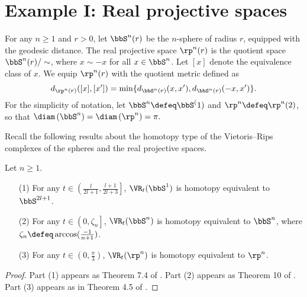 
\section{Example I: Real projective spaces}\label{s:continuous}



For any $n\geq 1$ and $r>0$, let $\bbS^n(r)$ be the $n$-sphere of radius $r$, equipped with the geodesic distance.
The real projective space $\rp^n(r)$ is the quotient space $\bbS^n(r)/\sim$, where $x\sim -x$ for all $x\in \bbS^n $. Let $[x]$ denote the equivalence class of $x$. We equip $\rp^n(r)$ with the quotient metric defined as
\[d_{\rp^n(r)}([x],[x'])=\min \{d_{\bbS^n(r)}(x,x'),d_{\bbS^n(r)}(-x,x')\}.\]
For the simplicity of notation, let $\bbS^n\defeq\bbS^(1)$ and $\rp^n\defeq\rp^n(2)$, so that $\diam\left(\bbS^n \right)=\diam\left(\rp^n \right)=\pi.$

Recall the following results about the homotopy type of the Vietoris--Rips complexes of the spheres and the real projective spaces.
\begin{proposition}\label{prop:homotopy type}
	Let $n\geq 1$.
	\begin{itemize}
		\item[(1)]\label{prop:S1} For any $ t\in \left(\frac{l}{2l+1},\frac{l+1}{2l+3}\right]$, $\VR_t(\bbS^1)$ is homotopy equivalent to $\bbS^{2l+1}$.
		\item[(2)]\label{prop:Sn} For any $ t\in \left(0,\zeta_n\right]$, $\VR_t(\bbS^n)$ is homotopy equivalent to $\bbS^n$, where $\zeta_n\defeq\arccos(\frac{-1}{n+1})$.
		\item[(3)]\label{prop:RPn} For any $ t\in \left(0,\frac{\pi}{3} \right)$, $\VR_t(\rp^n)$ is homotopy equivalent to $\rp^n$.
	\end{itemize}
\end{proposition}

\begin{proof}
	Part (1) appears as Theorem 7.4 of \cite{adamaszek2017vietoris}. Part (2) appears as Theorem 10 of \cite{lim2020vietoris}. Part (3) appears as in Theorem 4.5 of \cite{adams2022metric}.
\end{proof}

